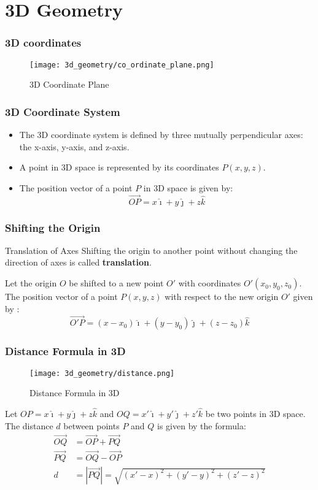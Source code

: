 \section{3D Geometry}
\label{sec:3d_geometry}

\begin{frame}
    \frametitle{3D coordinates}
    \begin{figure}
        \texttt{[image: 3d\_geometry/co\_ordinate\_plane.png]}
        \caption{3D Coordinate Plane}
    \end{figure}
\end{frame}

\begin{frame}
    \frametitle{3D Coordinate System}
    \begin{itemize}
        \item The 3D coordinate system is defined by three mutually perpendicular axes: the x-axis, y-axis, and z-axis.
        \item A point in 3D space is represented by its coordinates \(P(x, y, z)\).
        \item The position vector of a point \(P\) in 3D space is given by:
        \[
        \vec{OP} = x\hat{\imath} + y\hat{\jmath} + z\hat{k}
        \]
    \end{itemize}       
\end{frame}

\begin{frame}
    \frametitle{Shifting the Origin}
    \begin{block}{Translation of Axes}
        Shifting the origin  to another point without changing the direction of axes is called \textbf{translation}.
    \end{block}
   Let the origin \(O\) be shifted to a new point \(O'\) with coordinates \(O'(x_0, y_0, z_0)\). The position vector of a point \(P(x,y,z)\) with respect to the new origin \(O'\) given by :
    \[
        \vec{O'P} = (x - x_0)\hat{\imath} + (y - y_0)\hat{\jmath} + (z - z_0)\hat{k}
    \]
\end{frame}

\begin{frame}
\frametitle{Distance Formula in 3D}
\begin{figure}
    \texttt{[image: 3d\_geometry/distance.png]}
    \caption{Distance Formula in 3D}
\end{figure}
Let \(OP = x \hat{\imath} + y \hat{\jmath} + z \hat{k}\)  and \(OQ = x' \hat{\imath} + y' \hat{\jmath} + z' \hat{k}\) be two points in 3D space. The distance \(d\) between points \(P\) and \(Q\) is given by the formula:
\begin{align*}
    \vec{OQ} &= \vec{OP} + \vec{PQ} \\
    \vec{PQ} &= \vec{OQ} - \vec{OP} \\
    d &= |\vec{PQ}| = \sqrt{(x' - x)^2 + (y' - y)^2 + (z' - z)^2}
\end{align*}
\end{frame}

